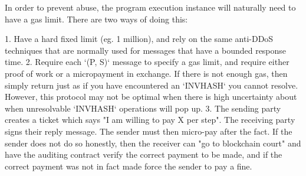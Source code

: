 \documentclass[10pt,a4paper,oneside]{scrartcl}
\begin{document}
In order to prevent abuse, the program execution instance will naturally need to have a gas limit. There are two ways of doing this:

1. Have a hard fixed limit (eg. 1 million), and rely on the same anti-DDoS techniques that are normally used for messages that have a bounded response time.
2. Require each `(P, S)` message to specify a gas limit, and require either proof of work or a micropayment in exchange. If there is not enough gas, then simply return just as if you have encountered an `INVHASH` you cannot resolve. However, this protocol may not be optimal when there is high uncertainty about when unresolvable `INVHASH` operations will pop up.
3. The sending party creates a ticket which says "I am willing to pay X per step". The receiving party signs their reply message. The sender must then micro-pay after the fact. If the sender does not do so honestly, then the receiver can "go to blockchain court" and have the auditing contract verify the correct payment to be made, and if the correct payment was not in fact made force the sender to pay a fine.

\printbibliography
\end{document}
